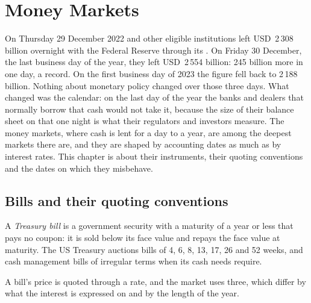 \chapter{Money Markets}\label{ch:m2:money-markets}

On Thursday 29 December 2022  and other eligible
institutions left USD~2\,308 billion overnight with the Federal Reserve
through its . On Friday 30 December, the last business
day of the year, they left USD~2\,554 billion: 245 billion more in one day, a
record. On the first business day of 2023 the figure fell back to 2\,188
billion. Nothing about monetary policy changed over those three days. What
changed was the calendar: on the last day of the year the banks and dealers
that normally borrow that cash would not take it, because the size of their
balance sheet on that one night is what their regulators and investors
measure. The money markets, where cash is lent for a day to a year, are among
the deepest markets there are, and they are shaped by accounting dates as
much as by interest rates. This chapter is about their instruments, their
quoting conventions and the dates on which they misbehave.

\section{Bills and their quoting conventions}

\begin{definition}\label{def:m2:money-markets:bill}
A \emph{Treasury bill} is a government security with a
maturity of a year or less that pays no coupon: it is sold below its face
value and repays the face value at maturity. The US Treasury auctions bills
of 4, 6, 8, 13, 17, 26 and 52 weeks, and cash management bills of irregular
terms when its cash needs require.
\end{definition}

A bill's price is quoted through a rate, and the market uses three, which
differ by what the interest is expressed on and by the length of the year.

